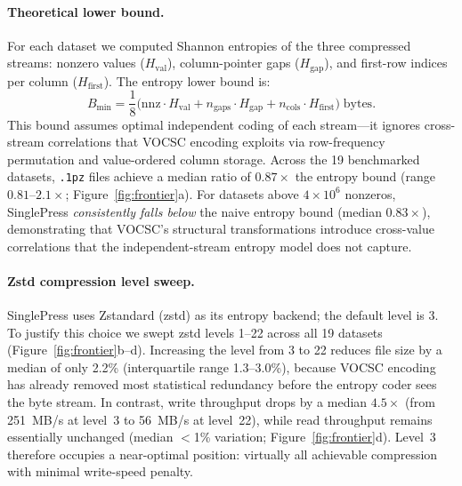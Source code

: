 \documentclass[10pt,twocolumn,letterpaper]{article}
\begin{document}
\paragraph{Theoretical lower bound.}
For each dataset we computed Shannon entropies of the three compressed streams: nonzero values ($H_\text{val}$), column-pointer gaps ($H_\text{gap}$), and first-row indices per column ($H_\text{first}$).
The entropy lower bound is:
\begin{equation}
B_\text{min} = \frac{1}{8}\bigl(\text{nnz}\cdot H_\text{val} + n_\text{gaps}\cdot H_\text{gap} + n_\text{cols}\cdot H_\text{first}\bigr) \; \text{bytes}.
\label{eq:entropy}
\end{equation}
This bound assumes optimal independent coding of each stream---it ignores cross-stream correlations that VOCSC encoding exploits via row-frequency permutation and value-ordered column storage.
Across the 19 benchmarked datasets, \texttt{.1pz} files achieve a median ratio of $0.87\times$ the entropy bound (range $0.81$--$2.1\times$; Figure~\ref{fig:frontier}a).
For datasets above $4 \times 10^6$ nonzeros, SinglePress \emph{consistently falls below} the naive entropy bound (median $0.83\times$), demonstrating that VOCSC's structural transformations introduce cross-value correlations that the independent-stream entropy model does not capture.

\paragraph{Zstd compression level sweep.}
SinglePress uses Zstandard (zstd) as its entropy backend; the default level is 3.
To justify this choice we swept zstd levels 1--22 across all 19 datasets (Figure~\ref{fig:frontier}b--d).
Increasing the level from 3 to 22 reduces file size by a median of only 2.2\% (interquartile range 1.3--3.0\%), because VOCSC encoding has already removed most statistical redundancy before the entropy coder sees the byte stream.
In contrast, write throughput drops by a median $4.5\times$ (from 251~MB/s at level~3 to 56~MB/s at level~22), while read throughput remains essentially unchanged (median $<$1\% variation; Figure~\ref{fig:frontier}d).
Level~3 therefore occupies a near-optimal position: virtually all achievable compression with minimal write-speed penalty.
\end{document}
